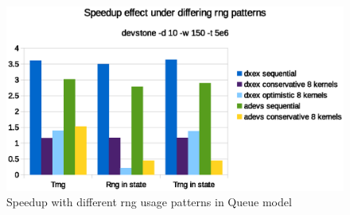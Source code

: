 \begin{figure}
	\center
	
	\includegraphics[width=\modelfraction\columnwidth]{fig/rngspeedupeffectdevstone.eps}
	\caption{Speedup with different rng usage patterns in Queue model}
	\label{fig:Queuerngspeedup}
	
	
\end{figure}